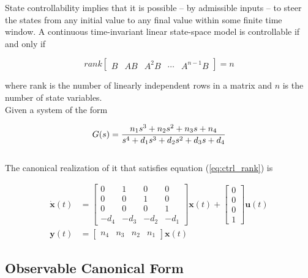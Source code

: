 \documentclass[10pt,conference,compsoc]{IEEEtran}
\newcommand{\mtx}[1] {\bm #1}
\begin{document}
\noindent State controllability implies that it is possible -- by admissible
inputs -- to steer the \glspl{state} from any initial value to any final value
within some finite time window. A continuous \gls{time-invariant} linear
state-space model is controllable if and only if

\begin{equation}
  rank \left[
  \begin{array}{ccccc}
    B & AB & A^2B & \cdots & A^{n-1}B
  \end{array}
  \right] = n
  \label{eq:ctrl_rank}
\end{equation}

\noindent where rank is the number of linearly independent rows in a matrix and
$n$ is the number of \gls{state} variables. \\

\noindent Given a \gls{system} of the form

\begin{equation} \label{eq:ctrl_obsv_tf}
  G(s) = \frac{n_1 s^3 + n_2 s^2 + n_3 s + n_4}
    {s^4 + d_1 s^3 + d_2 s^2 + d_3 s + d_4} \\
\end{equation}
\\
\noindent The canonical realization of it that satisfies equation
(\ref{eq:ctrl_rank}) is

\begin{align}
  \dot{\mtx{x}}(t) &= \left[
  \begin{array}{cccc}
    0 & 1 & 0 & 0 \\
    0 & 0 & 1 & 0 \\
    0 & 0 & 0 & 1 \\
    -d_4 & -d_3 & -d_2 & -d_1
  \end{array}
  \right] \mtx{x}(t) + \left[
  \begin{array}{c}
    0 \\
    0 \\
    0 \\
    1
  \end{array}
  \right] \mtx{u}(t) \\
  \mtx{y}(t) &= \left[
  \begin{array}{cccc}
    n_4 & n_3 & n_2 & n_1
  \end{array}
  \right] \mtx{x}(t)
\end{align}

\subsection{Observable Canonical Form} \label{subsec:obsv_canon}
\end{document}

